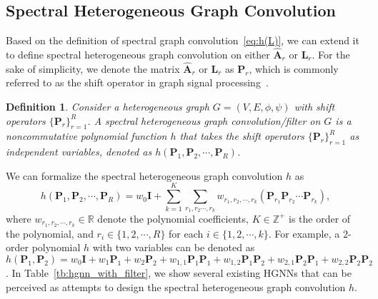 \documentclass{article}
\newtheorem{definition}{Definition}[section]
\begin{document}
\subsection{Spectral Heterogeneous Graph Convolution}
Based on the definition of spectral graph convolution~\eqref{eq:h(L)}, we can extend it to define spectral heterogeneous graph convolution on either $\hat{\mathbf{A}}_r$ or $\mathbf{L}_r$. For the sake of simplicity, we denote the matrix $\hat{\mathbf{A}}_r$ or $\mathbf{L}_r$ as $\mathbf{P}_r$, which is commonly referred to as the shift operator in graph signal processing~\cite{graphsignal}.


\begin{definition}\label{h_conv}
Consider a heterogeneous graph $G=(V,E,\phi , \psi)$ with shift operators $\{\mathbf{P}_r\}_{r=1}^{R}$. A spectral heterogeneous graph convolution/filter on $G$ is a noncommutative polynomial function $h$ that takes the shift operators $\{\mathbf{P}_r\}_{r=1}^{R}$ as independent variables, denoted as $h(\mathbf{P}_1,\mathbf{P}_2,\cdots,\mathbf{P}_R)$.
\end{definition}
We can formalize the spectral heterogeneous graph convolution $h$ as
\begin{equation}\label{eq:g}
h(\mathbf{P}_1,\mathbf{P}_2,\cdots,\mathbf{P}_R) = w_0\mathbf{I}+\sum\limits_{k=1}^{K}\sum\limits_{r_1,r_2\cdots,r_k}w_{r_1,r_2,\cdots,r_k}\left(\mathbf{P}_{r_1}\mathbf{P}_{r_2}\cdots\mathbf{P}_{r_k}\right),
\end{equation}
where $w_{r_1,r_2,\cdots,r_k} \in \mathbb{R}$ denote the polynomial coefficients, $K \in \mathbb{Z}^+$ is the order of the polynomial, and $r_i \in \{1,2,\cdots,R\}$ for each $i \in \{1,2,\cdots,k\}$.
For example, a $2$-order polynomial $h$ with two variables can be denoted as $h(\mathbf{P}_1,\mathbf{P}_2)=w_0\mathbf{I}+w_1\mathbf{P}_{1}+w_2\mathbf{P}_{2}+w_{1,1}\mathbf{P}_{1}\mathbf{P}_{1}+w_{1,2}\mathbf{P}_{1}\mathbf{P}_{2}+w_{2,1}\mathbf{P}_{2}\mathbf{P}_{1}+w_{2,2}\mathbf{P}_{2}\mathbf{P}_{2}$.  In Table~\ref{tb:hgnn_with_filter}, we show several existing HGNNs that can be perceived as attempts to design the spectral heterogeneous graph convolution $h$.
\end{document}
